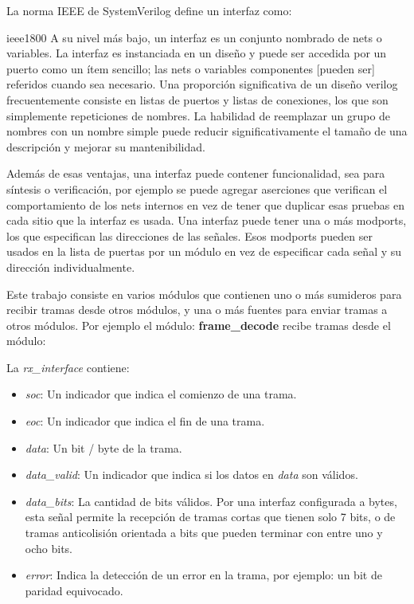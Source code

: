 \documentclass[a4paper, twoside, 11pt]{report}
\begin{document}
La norma IEEE de SystemVerilog define un interfaz como:

\begin{displaycquote}{ieee1800}
A su nivel más bajo, un interfaz es un conjunto nombrado de nets o variables. La interfaz es instanciada en un diseño y puede ser accedida por un puerto como un ítem sencillo; las nets o variables componentes [pueden ser] referidos cuando sea necesario. Una proporción significativa de un diseño verilog frecuentemente consiste en listas de puertos y listas de conexiones, los que son simplemente repeticiones de nombres. La habilidad de reemplazar un grupo de nombres con un nombre simple puede reducir significativamente el tamaño de una descripción y mejorar su mantenibilidad. 
\end{displaycquote}

Además de esas ventajas, una interfaz puede contener funcionalidad, sea para síntesis o verificación, por ejemplo se puede agregar aserciones que verifican el comportamiento de los nets internos en vez de tener que duplicar esas pruebas en cada sitio que la interfaz es usada. Una interfaz puede tener una o más modports, los que especifican las direcciones de las señales. Esos modports pueden ser usados en la lista de puertas por un módulo en vez de especificar cada señal y su dirección individualmente.

Este trabajo consiste en varios módulos que contienen uno o más sumideros para recibir tramas desde otros módulos, y una o más fuentes para enviar tramas a otros módulos. Por ejemplo el módulo: \textbf{frame\_decode} recibe tramas desde el módulo: 

La \textit{rx\_interface} contiene:

\begin{itemize}
  \item \textit{soc}: Un indicador que indica el comienzo de una trama.
  \item \textit{eoc}: Un indicador que indica el fin de una trama.
  \item \textit{data}: Un bit / byte de la trama.
  \item \textit{data\_valid}: Un indicador que indica si los datos en \textit{data} son válidos.
  \item \textit{data\_bits}: La cantidad de bits válidos. Por una interfaz configurada a bytes, esta señal permite la recepción de tramas cortas que tienen solo 7 bits, o de tramas anticolisión orientada a bits que pueden terminar con entre uno y ocho bits.
  \item \textit{error}: Indica la detección de un error en la trama, por ejemplo: un bit de paridad equivocado.
\end{itemize}
\end{document}

